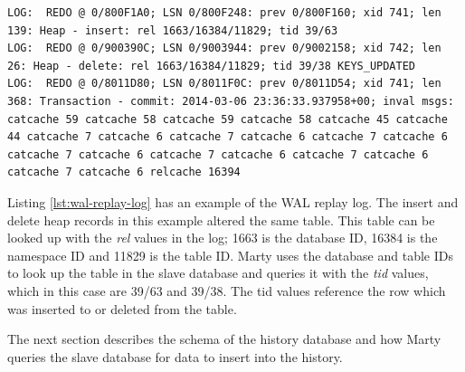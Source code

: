 \begin{lstlisting}[caption={WAL replay log example},label={lst:wal-replay-log}]
LOG:  REDO @ 0/800F1A0; LSN 0/800F248: prev 0/800F160; xid 741; len 139: Heap - insert: rel 1663/16384/11829; tid 39/63
LOG:  REDO @ 0/900390C; LSN 0/9003944: prev 0/9002158; xid 742; len 26: Heap - delete: rel 1663/16384/11829; tid 39/38 KEYS_UPDATED
LOG:  REDO @ 0/8011D80; LSN 0/8011F0C: prev 0/8011D54; xid 741; len 368: Transaction - commit: 2014-03-06 23:36:33.937958+00; inval msgs: catcache 59 catcache 58 catcache 59 catcache 58 catcache 45 catcache 44 catcache 7 catcache 6 catcache 7 catcache 6 catcache 7 catcache 6 catcache 7 catcache 6 catcache 7 catcache 6 catcache 7 catcache 6 catcache 7 catcache 6 relcache 16394
\end{lstlisting}

Listing \ref{lst:wal-replay-log} has an example of the WAL replay log.
The insert and delete heap records in this example altered the same table.
This table can be looked up with the \textit{rel} values in the log; 1663 is the database ID, 16384 is the namespace ID and 11829 is the table ID.
Marty uses the database and table IDs to look up the table in the slave database and queries it with the \textit{tid} values, which in this case are 39/63 and 39/38.
The tid values reference the row which was inserted to or deleted from the table.

The next section describes the schema of the history database and how Marty queries the slave database for data to insert into the history.
